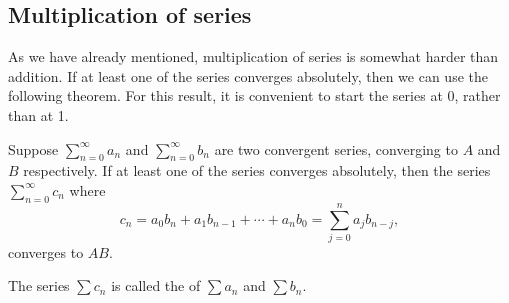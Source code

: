 \subsection{Multiplication of series}

As we have
already mentioned,
multiplication of series is somewhat harder than addition.
If at least one of the series converges
absolutely, then we can use the following theorem.  For this result, it is
convenient to start the series at 0, rather than at 1.

\begin{thm}
Suppose $\sum_{n=0}^\infty a_n$ and $\sum_{n=0}^\infty b_n$ are two convergent series, converging
to $A$ and $B$ respectively.  If at least one of the series
converges absolutely, then the series $\sum_{n=0}^\infty c_n$ where
\begin{equation*}
c_n = a_0 b_n + a_1 b_{n-1} + \cdots + a_n b_0 = \sum_{j=0}^n a_j b_{n-j} ,
\end{equation*}
converges to $AB$.
\end{thm}

The series $\sum c_n$ is called the \emph{} of
$\sum a_n$ and $\sum b_n$.

